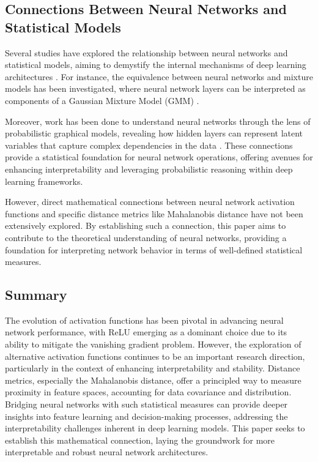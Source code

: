 \subsection{Connections Between Neural Networks and Statistical Models}

Several studies have explored the relationship between neural networks and statistical models, aiming to demystify the internal mechanisms of deep learning architectures \citep{bengio2013representation, goodfellow2016deep}. For instance, the equivalence between neural networks and mixture models has been investigated, where neural network layers can be interpreted as components of a Gaussian Mixture Model (GMM) \citep{nguyen2011deep}.

Moreover, work has been done to understand neural networks through the lens of probabilistic graphical models, revealing how hidden layers can represent latent variables that capture complex dependencies in the data \citep{kingma2014semi, hinton2007semi}. These connections provide a statistical foundation for neural network operations, offering avenues for enhancing interpretability and leveraging probabilistic reasoning within deep learning frameworks.

However, direct mathematical connections between neural network activation functions and specific distance metrics like Mahalanobis distance have not been extensively explored. By establishing such a connection, this paper aims to contribute to the theoretical understanding of neural networks, providing a foundation for interpreting network behavior in terms of well-defined statistical measures.

\subsection{Summary}

The evolution of activation functions has been pivotal in advancing neural network performance, with ReLU emerging as a dominant choice due to its ability to mitigate the vanishing gradient problem. However, the exploration of alternative activation functions continues to be an important research direction, particularly in the context of enhancing interpretability and stability. Distance metrics, especially the Mahalanobis distance, offer a principled way to measure proximity in feature spaces, accounting for data covariance and distribution. Bridging neural networks with such statistical measures can provide deeper insights into feature learning and decision-making processes, addressing the interpretability challenges inherent in deep learning models. This paper seeks to establish this mathematical connection, laying the groundwork for more interpretable and robust neural network architectures.

